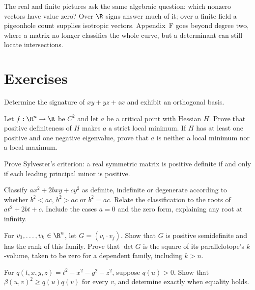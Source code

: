 The real and finite pictures ask the same algebraic question: which
nonzero vectors have value zero? Over $\R$ signs answer much of it;
over a finite field a pigeonhole count supplies isotropic vectors.
Appendix~F goes beyond degree two, where a matrix no longer classifies
the whole curve, but a determinant can still locate intersections.

\section{Exercises}

\begin{exercise}[$\star$]\label{geometry:ex:signxyz}
Determine the signature of $xy+yz+zx$ and exhibit an orthogonal basis.
\end{exercise}
\begin{exercise}[$\star$]\label{geometry:ex:hessian}
Let $f:\R^n\to\R$ be $C^2$ and let $a$ be a critical point with Hessian
$H$. Prove that positive definiteness of $H$ makes $a$ a strict local
minimum. If $H$ has at least one positive and one negative eigenvalue,
prove that $a$ is neither a local minimum nor a local maximum.
\end{exercise}
\begin{exercise}[$\star\star$]\label{geometry:ex:sylvestercrit}
Prove Sylvester's criterion: a real symmetric matrix is positive definite
if and only if each leading principal minor is positive.
\end{exercise}
\begin{exercise}[$\star$]\label{geometry:ex:binarydisc}
Classify $ax^2+2bxy+cy^2$ as definite, indefinite or degenerate according
to whether $b^2<ac$, $b^2>ac$ or $b^2=ac$.
Relate the classification to the roots of $at^2+2bt+c$.
Include the cases $a=0$ and the zero form, explaining any root at infinity.
\end{exercise}
\begin{exercise}[$\star$]\label{geometry:ex:gram}
For $v_1,\ldots,v_k\in\R^n$, let $G=(v_i\cdot v_j)$.
Show that $G$ is positive semidefinite and has the rank of this family.
Prove that $\det G$ is the square of its parallelotope's $k$-volume,
taken to be zero for a dependent family, including $k>n$.
\end{exercise}
\begin{exercise}[$\star\star$]\label{geometry:ex:lorentz}
For $q(t,x,y,z)=t^2-x^2-y^2-z^2$, suppose $q(u)>0$.
Show that $\beta(u,v)^2\ge q(u)q(v)$ for every $v$,
and determine exactly when equality holds.
\end{exercise}
